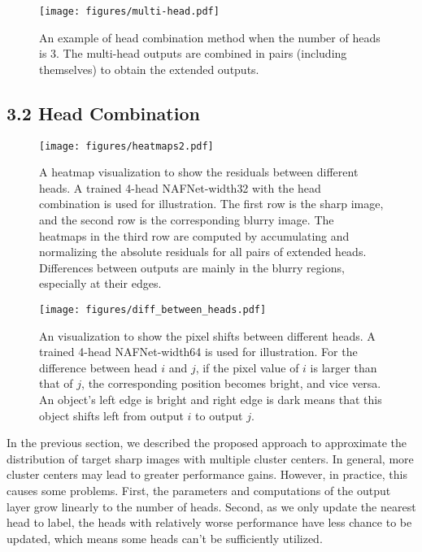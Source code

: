 \documentclass[letterpaper]{article} \usepackage{aaai23}  \usepackage{times}  \usepackage{helvet}  \usepackage{courier}  \usepackage[hyphens]{url}  \usepackage{graphicx} \urlstyle{rm} \def\UrlFont{\rm}  \usepackage{natbib}  \usepackage{caption} \frenchspacing  \setlength{\pdfpagewidth}{8.5in} \setlength{\pdfpageheight}{11in} \usepackage{algorithm}
\begin{document}
\begin{figure}
    \centering
    \texttt{[image: figures/multi-head.pdf]}
    \caption{An example of head combination method when the number of heads is 3. The multi-head outputs are combined in pairs (including themselves) to obtain the extended outputs.}
    \label{fig:multi-head}
\end{figure}

\subsection{3.2 \quad Head Combination}
\begin{figure*}
    \centering
    \texttt{[image: figures/heatmaps2.pdf]}
    \caption{A heatmap visualization to show the residuals between different heads. A trained 4-head NAFNet-width32 with the head combination is used for illustration. The first row is the sharp image, and the second row is the corresponding blurry image. The heatmaps in the third row are computed by accumulating and normalizing the absolute residuals for all pairs of extended heads. Differences between outputs are mainly in the blurry regions, especially at their edges.}
    \label{fig:heatmaps}
\end{figure*}
\begin{figure}[t]
    \centering
    \texttt{[image: figures/diff\_between\_heads.pdf]}
    \caption{An visualization to show the pixel shifts between different heads. A trained 4-head NAFNet-width64 is used for illustration. For the difference between head $i$ and $j$, if the pixel value of $i$ is larger than that of $j$, the corresponding position becomes bright, and vice versa. An object's left edge is bright and right edge is dark means that this object shifts left from output $i$ to output $j$.}
    \label{fig:diff_between_heads}
\end{figure}








In the previous section, we described the proposed approach to approximate the distribution of target sharp images with multiple cluster centers. In general, more cluster centers may lead to greater performance gains. However, in practice, this causes some problems. First, the parameters and computations of the output layer grow linearly to the number of heads. Second, as we only update the nearest head to label, the heads with relatively worse performance have less chance to be updated, which means some heads can't be sufficiently utilized. 
\end{document}
